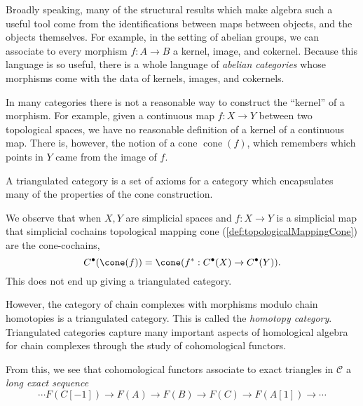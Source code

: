 

Broadly speaking, many of the structural results which make algebra such a useful tool come from the identifications between maps between objects, and the objects themselves. For example, in the setting of abelian groups, we can associate to every morphism $f: A\to B$ a kernel, image, and cokernel. Because this language is so useful, there is a whole language of \emph{abelian categories} whose morphisms come with the data of kernels, images, and cokernels.

In many categories there is not a reasonable way to construct the ``kernel'' of a morphism. For example, given a continuous map $f: X\to Y$ between two topological spaces, we have no reasonable definition of a kernel of a continuous map. There is, however, the notion of a cone $\operatorname{cone}(f)$, which remembers which points in $Y$ came from the image of $f$. 


A triangulated category is a set of axioms for a category which encapsulates many of the properties of the cone construction. 


We observe that when $X, Y$ are simplicial spaces and $f:X\to Y$ is a simplicial map that simplicial cochains topological mapping cone (\cref{def:topologicalMappingCone}) are the cone-cochains,
\[C^\bullet(\cone(f))=\cone(f^*:C^\bullet(X)\to C^\bullet(Y)).\]
This does not end up giving a triangulated category.

However, the category of chain complexes with morphisms modulo chain homotopies is a triangulated category. This is called the \emph{homotopy category}.
Triangulated categories capture many important aspects of homological algebra for chain complexes through the study of cohomological functors. 

From this, we see that cohomological functors associate to exact triangles in $\mathcal C$ a \emph{long exact sequence}
\[\cdots F(C[-1])\to F(A)\to F(B)\to F(C)\to F(A[1])\to \cdots \]



